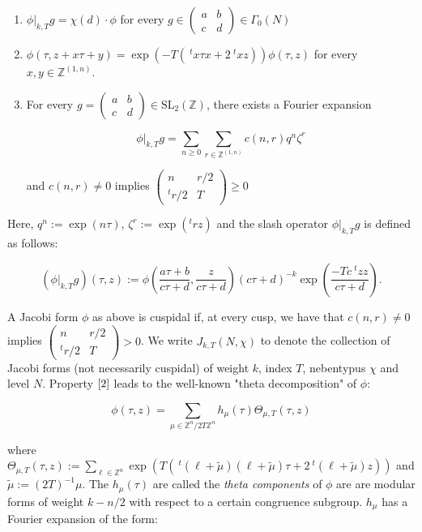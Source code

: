 \documentclass[11pt]{article}
\theoremstyle{definition}
\theoremstyle{remark}
\newcommand{\Z}{\mathbb{Z}}
\begin{document}
\begin{enumerate}
    \item $\phi \vert_{k,T} g = \chi(d) \cdot \phi$ for every $g \in \begin{pmatrix} a & b \\ c & d \end{pmatrix} \in \Gamma_0(N)$
    \item $\phi(\tau,z+x\tau+y) = \exp(-T( \ ^tx\tau x+2 \ ^txz))\phi(\tau,z)$ for every $x,y \in \Z^{(1,n)}$. \label{2}
    \item For every $g = \begin{pmatrix} a & b \\ c & d \end{pmatrix} \in \text{SL}_2(\mathbb{Z})$, there exists a Fourier expansion 
    
    \[
    \phi \vert_{k,T} g = \sum_{n \geq 0} \sum_{r \in \Z^{(1,n)}} c(n,r) q^n\zeta^r
    \]

    and $c(n,r) \neq 0$ implies $\begin{pmatrix}
        n & r/2 \\ ^tr/2 & T
    \end{pmatrix} \geq 0$
\end{enumerate}

Here, $q^n := \exp(n\tau)$, $\zeta^r := \exp(^trz)$ and the slash operator $\phi \vert_{k,T} g$ is defined as follows:

\[(\phi \vert_{k,T} g)(\tau,z) := \phi \left(\frac{a\tau + b}{c\tau+d}, \frac{z}{c\tau+d}\right)(c\tau+d)^{-k} \exp\left(\frac{-Tc\ ^tzz}{c\tau+d}\right).
\]

A Jacobi form $\phi$ as above is cuspidal if, at every cusp, we have that $c(n,r) \neq 0$ implies $\begin{pmatrix}
    n & r/2 \\ ^tr/2 & T
\end{pmatrix} > 0$. We write $J_{k,T}(N,\chi)$ to denote the collection of Jacobi forms (not necessarily cuspidal) of weight $k$, index $T$, nebentypus $\chi$ and level $N$. Property $\ref{2}$ leads to the well-known "theta decomposition" of $\phi$:

\[
\phi(\tau,z) = \sum_{\mu \in \Z^n/2T\Z^n} h_\mu(\tau) \Theta_{\mu,T}(\tau,z)
\]

where $\displaystyle \Theta_{\mu,T}(\tau,z) := \sum_{\ell \in \Z^n} \exp(T(\ ^t(\ell + \tilde{\mu})(\ell + \tilde{\mu}) \tau + 2 \ ^t(\ell + \tilde{\mu})z))$ and $\tilde{\mu} := (2T)^{-1}\mu$. The $h_\mu(\tau)$ are called the \textit{theta components} of $\phi$ are are modular forms of weight $k - n/2$ with respect to a certain congruence subgroup. $h_\mu$ has a Fourier expansion of the form:
\end{document}
